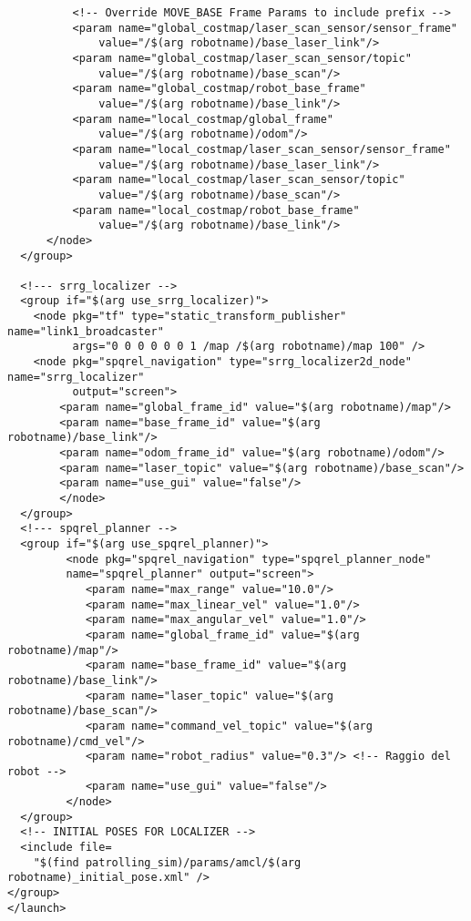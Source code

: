 \begin{lstlisting}
          <!-- Override MOVE_BASE Frame Params to include prefix -->
          <param name="global_costmap/laser_scan_sensor/sensor_frame" 
              value="/$(arg robotname)/base_laser_link"/>
          <param name="global_costmap/laser_scan_sensor/topic" 
              value="/$(arg robotname)/base_scan"/>
          <param name="global_costmap/robot_base_frame" 
              value="/$(arg robotname)/base_link"/>   
          <param name="local_costmap/global_frame" 
              value="/$(arg robotname)/odom"/>
          <param name="local_costmap/laser_scan_sensor/sensor_frame" 
              value="/$(arg robotname)/base_laser_link"/>
          <param name="local_costmap/laser_scan_sensor/topic" 
              value="/$(arg robotname)/base_scan"/>
          <param name="local_costmap/robot_base_frame" 
              value="/$(arg robotname)/base_link"/> 
      </node>
  </group>

  <!--- srrg_localizer -->
  <group if="$(arg use_srrg_localizer)">
    <node pkg="tf" type="static_transform_publisher" name="link1_broadcaster" 
          args="0 0 0 0 0 0 1 /map /$(arg robotname)/map 100" />
    <node pkg="spqrel_navigation" type="srrg_localizer2d_node" name="srrg_localizer"
          output="screen">
        <param name="global_frame_id" value="$(arg robotname)/map"/>
        <param name="base_frame_id" value="$(arg robotname)/base_link"/>
        <param name="odom_frame_id" value="$(arg robotname)/odom"/>
        <param name="laser_topic" value="$(arg robotname)/base_scan"/>
        <param name="use_gui" value="false"/>
        </node>
  </group>
  <!--- spqrel_planner -->    
  <group if="$(arg use_spqrel_planner)">            
         <node pkg="spqrel_navigation" type="spqrel_planner_node" 
         name="spqrel_planner" output="screen">
            <param name="max_range" value="10.0"/>
            <param name="max_linear_vel" value="1.0"/>
            <param name="max_angular_vel" value="1.0"/>
            <param name="global_frame_id" value="$(arg robotname)/map"/>
            <param name="base_frame_id" value="$(arg robotname)/base_link"/>
            <param name="laser_topic" value="$(arg robotname)/base_scan"/>
            <param name="command_vel_topic" value="$(arg robotname)/cmd_vel"/>
            <param name="robot_radius" value="0.3"/> <!-- Raggio del robot -->
            <param name="use_gui" value="false"/>
         </node>
  </group>
  <!-- INITIAL POSES FOR LOCALIZER -->
  <include file=
    "$(find patrolling_sim)/params/amcl/$(arg robotname)_initial_pose.xml" />
</group>
</launch>
\end{lstlisting}

